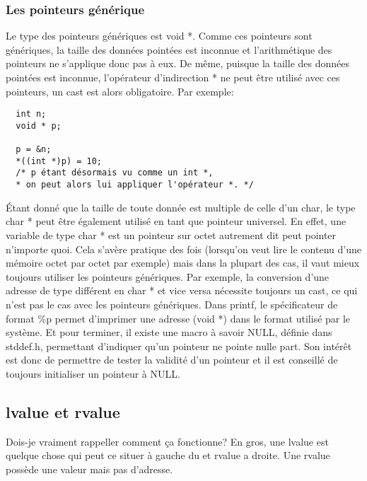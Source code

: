 \documentclass[a4paper]{article}
\begin{document}
\subsubsection{Les pointeurs générique}
 Le type des pointeurs génériques est void *. Comme ces pointeurs sont génériques, la taille des données pointées est inconnue et l'arithmétique des pointeurs ne s'applique donc pas à eux. De même, puisque la taille des données pointées est inconnue, l'opérateur d'indirection * ne peut être utilisé avec ces pointeurs, un cast est alors obligatoire. Par exemple:
\begin{lstlisting}
  int n;
  void * p;
  
  p = &n;
  *((int *)p) = 10;
  /* p étant désormais vu comme un int *,
  * on peut alors lui appliquer l'opérateur *. */ 
\end{lstlisting}
Étant donné que la taille de toute donnée est multiple de celle d'un char, le type char * peut être également utilisé en tant que pointeur universel. En effet, une variable de type char * est un pointeur sur octet autrement dit peut pointer n'importe quoi. Cela s'avère pratique des fois (lorsqu'on veut lire le contenu d'une mémoire octet par octet par exemple) mais dans la plupart des cas, il vaut mieux toujours utiliser les pointeurs génériques. Par exemple, la conversion d'une adresse de type différent en char * et vice versa nécessite toujours un cast, ce qui n'est pas le cas avec les pointeurs génériques.\newline
Dans printf, le spécificateur de format \%p permet d'imprimer une adresse (void *) dans le format utilisé par le système.\newline
Et pour terminer, il existe une macro à savoir NULL, définie dans stddef.h, permettant d'indiquer qu'un pointeur ne pointe nulle part. Son intérêt est donc de permettre de tester la validité d'un pointeur et il est conseillé de toujours initialiser un pointeur à NULL.

\subsection{lvalue et rvalue}
Dois-je vraiment rappeller comment ça fonctionne?
En gros, une lvalue est quelque chose qui peut ce situer à gauche du \guillemotleft{=}\guillemotright{} et rvalue a droite. Une rvalue possède une valeur mais pas d'adresse.
\end{document}
